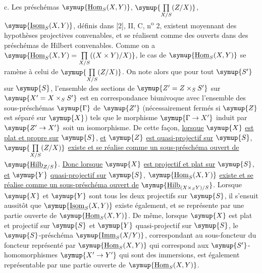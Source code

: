 \medskip
\noindent c. Les préschémas $\symup{\underline{\operatorname{Hom}}_S(X,Y)}$,
$\symup{\prod\limits_{X/S}(Z/X)}$, $\symup{\underline{\operatorname{Isom}}_S(X,Y)}$, définis dans [2], II, C,
n\textsuperscript{o} 2, existent moyennant des hypothèses projectives
convenables, et se réalisent comme des ouverts dans des préschémas de Hilbert
convenables. Comme on a $\symup{\underline{\operatorname{Hom}}_S(X,Y)=\prod\limits_{X/S}((X\times Y)/X)}$, le cas de $\symup{\underline{\operatorname{Hom}}_S(X,Y)}$ se ramène à celui de $\symup{\prod\limits_{X/S}(Z/X)}$.
On note alors que pour tout $\symup{S'}$ sur $\symup{S}$, l'ensemble des sections de
$\symup{Z'=Z\times_SS'}$ sur $\symup{X'=X\times_SS'}$ est en correspondance biunivoque avec
l'ensemble des sous-préschémas $\symup{\Gamma}$ de $\symup{Z'}$ (nécessairement fermés si $\symup{Z}$
est séparé sur $\symup{X}$) tels que le morphisme $\symup{\Gamma\to X'}$ induit par
$\symup{Z'\to X'}$ soit un isomorphisme. De cette façon,
\uline{lorsque} $\symup{X}$ \uline{est plat et propre sur} $\symup{S}$, \uline{et} $\symup{Z}$ \uline{est quasi-projectif sur} $\symup{S}$,
$\symup{\prod\limits_{X/S}(Z/X)}$ \uline{existe et se réalise comme un sous-préschéma ouvert de}
$\symup{\underline{\operatorname{Hilb}}_{Z/S}}$. \uline{Donc lorsque} $\symup{X}$ \uline{est projectif et plat sur} $\symup{S}$, \uline{et}
$\symup{Y}$ \uline{quasi-projectif sur} $\symup{S}$, $\symup{\underline{\operatorname{Hom}}_S(X,Y)}$ \uline{existe et se réalise
comme un sous-préschéma ouvert de}
$\symup{\underline{\operatorname{Hilb}}_{(X\times_SY)/S}}$. Lorsque $\symup{X}$ et $\symup{Y}$ sont tous les deux
projectifs sur $\symup{S}$, il s'ensuit aussitôt que $\symup{\underline{\operatorname{Isom}}_S(X,Y)}$
existe également, et se représente par une partie ouverte de
$\symup{\underline{\operatorname{Hom}}_S(X,Y)}$. De même, lorsque $\symup{X}$ est plat et projectif sur $\symup{S}$
et $\symup{Y}$ quasi-projectif sur $\symup{S}$, le $\symup{S}$-préschéma
$\symup{\underline{\operatorname{Imm}}_S(X/Y)}$, correspondant au sous-foncteur du foncteur
représenté par $\symup{\underline{\operatorname{Hom}}_S(X,Y)}$ qui correspond aux
$\symup{S'}$-homomorphismes $\symup{X'\to Y'}$ qui sont des immersions, est
également représentable par une partie ouverte de
$\symup{\underline{\operatorname{Hom}}_S(X,Y)}$.


